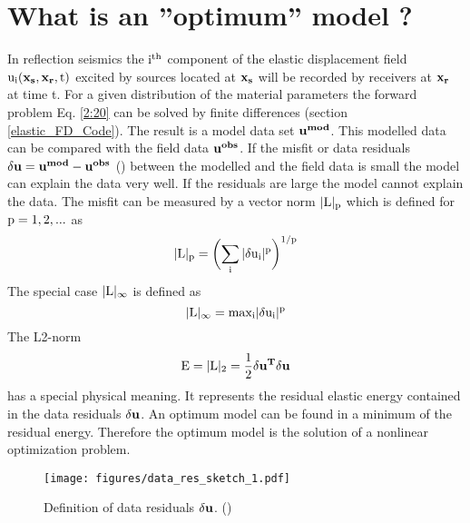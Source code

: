 \section{What is an ''optimum'' model ?}
In reflection seismics the $\rm{i^{th}}$ component of the elastic displacement field $\rm{u_i(\mathbf{x_s},\mathbf{x_r},t)}$ 
excited by sources located at $\rm{\mathbf{x_s}}$ will be recorded by receivers at $\rm{\mathbf{x_r}}$ at time t. 
For a given distribution of the material parameters the forward problem Eq. \ref{2:20} can be solved by finite differences (section \ref{elastic_FD_Code}). The result is a model data set $\rm{\mathbf{u^{mod}}}$. This modelled data can be compared with the field data $\rm{\mathbf{u^{obs}}}$. If the misfit or data residuals $\rm{\delta \mathbf{u} = \mathbf{u^{mod}} - \mathbf{u^{obs}}}$ () between the modelled and the field data is small the model can explain the data very well. If the residuals are large the model cannot explain the data. The misfit can be measured by a vector norm $\rm{|L|_p}$ which is defined for $\rm{p=1,2,...}$ as  
\begin{equation} 
\rm{|L|_p = \biggl(\sum_i|\delta u_i|^p\biggr)^{1/p}} 
\end{equation} 
The special case $\rm{|L|_\infty}$ is defined as
\begin{equation} 
\rm{|L|_\infty = max_i|\delta u_i|^p} 
\label{l-infty}
\end{equation} 
The L2-norm 
\begin{equation} 
\rm{E=|L|_2 = \frac{1}{2}\mathbf{\delta u^T} \mathbf{\delta u}} 
\label{l-norm}
\end{equation} 
has a special physical meaning. It represents the residual elastic energy contained in the data residuals $\rm{\delta \mathbf{u}}$. An optimum model can be found in a minimum of the residual energy. Therefore the optimum model is the solution of a nonlinear optimization problem.
\begin{figure}[!bh]
\begin{center}
\texttt{[image: figures/data\_res\_sketch\_1.pdf]}
\caption{Definition of data residuals $\rm{\mathbf{\delta u}}$. (\cite{koehn:11})}
\label{sketch_data_res}
\end{center}
\end{figure} 
\newpage
